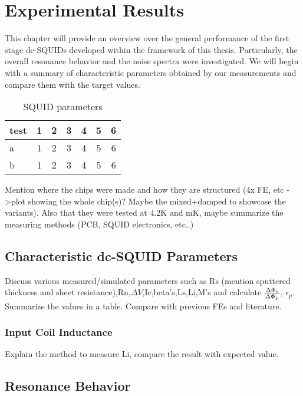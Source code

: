 \chapter{Experimental Results} \label{ch_results}

This chapter will provide an overview over the general performance of the first stage dc-SQUIDs developed within the framework of this thesis. Particularly, the overall resonance behavior and the noise spectra were investigated. We will begin with a summary of characteristic parameters obtained by our measurements and compare them with the target values.  

\begin{table}%
	\centering
\begin{tabular}{l*{6}{c}}
test & 1 & 2 & 3 & 4 & 5 & 6 \\
\hline
a & 1 & 2 & 3 & 4 & 5 & 6 \\
b & 1 & 2 & 3 & 4 & 5 & 6 \\
\end{tabular}
\caption{SQUID parameters}
\label{tab:SQUIDparameters}
\end{table}

Mention where the chips were made and how they are structured (4x FE, etc ->plot showing the whole chip(s)? Maybe the mixed+damped to showcase the variants). Also that they were tested at 4.2K and mK, maybe summarize the measuring methods (PCB, SQUID electronics, etc..)

\section{Characteristic dc-SQUID Parameters}

Discuss various measured/simulated parameters such as Rs (mention sputtered thickness and sheet resistance),Rn,$\Delta V$,Ic,beta's,Ls,Li,M's and calculate $\frac{\Delta\Phi_{\rm s}}{\Delta\Phi_{\rm p}}$, $\epsilon_p$. Summarize the values in a table. Compare with previous FEs and literature. 

\subsection{Input Coil Inductance}

Explain the method to measure Li, compare the result with expected value.

\section{Resonance Behavior}\label{sec_resonance_results}

